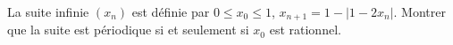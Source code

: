 La suite infinie $(x_n)$ est définie par $0 \leq x_0 \leq 1$, $x_{n+1} = 1 - |1 - 2x_n|$. Montrer que la suite est périodique si et seulement si $x_0$ est rationnel.

